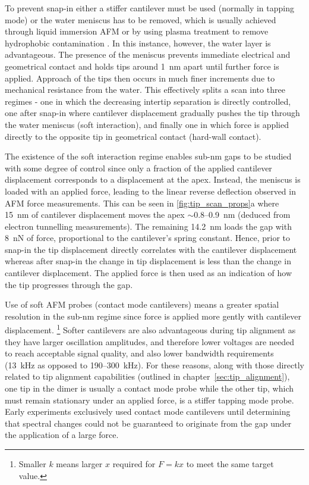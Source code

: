 \documentclass[a4paper]{article}
\begin{document}
To prevent snap-in either a stiffer cantilever must be used (normally in tapping mode) \cite{zhong1993fractured} or the water meniscus has to be removed, which is usually achieved through liquid immersion AFM \cite{hansma1994tapping, putman1994tapping, song2014} or by using plasma treatment to remove hydrophobic contamination \cite{song2014}. In this instance, however, the water layer is advantageous. The presence of the meniscus prevents immediate electrical and geometrical contact and holds tips around \SI{1}{nm} apart until further force is applied. Approach of the tips then occurs in much finer increments due to mechanical resistance from the water. This effectively splits a scan into three regimes - one in which the decreasing intertip separation is directly controlled, one after snap-in where cantilever displacement gradually pushes the tip through the water meniscus (soft interaction), and finally one in which force is applied directly to the opposite tip in geometrical contact (hard-wall contact).

The existence of the soft interaction regime enables sub-nm gaps to be studied with some degree of control since only a fraction of the applied cantilever displacement corresponds to a displacement at the apex. Instead, the meniscus is loaded with an applied force, leading to the linear reverse deflection observed in AFM force measurements. This can be seen in \autoref{fig:tip_scan_props}a where \SI{15}{nm} of cantilever displacement moves the apex $\sim$0.8--\SI{0.9}{nm} (deduced from electron tunnelling measurements). The remaining \SI{14.2}{nm} loads the gap with \SI{8}{nN} of force, proportional to the cantilever's spring constant. Hence, prior to snap-in the tip displacement directly correlates with the cantilever displacement whereas after snap-in the change in tip displacement is less than the change in cantilever displacement. The applied force is then used as an indication of how the tip progresses through the gap.

Use of soft AFM probes (contact mode cantilevers) means a greater spatial resolution in the sub-nm regime since force is applied more gently with cantilever displacement.%
\footnote{Smaller $k$ means larger $x$ required for $F=kx$ to meet the same target value.}
Softer cantilevers are also advantageous during tip alignment as they have larger oscillation amplitudes, and therefore lower voltages are needed to reach acceptable signal quality, and also lower bandwidth requirements (\SI{13}{kHz} as opposed to 190--\SI{300}{kHz}).
For these reasons, along with those directly related to tip alignment capabilities (outlined in chapter~\ref{sec:tip_alignment}), one tip in the dimer is usually a contact mode probe while the other tip, which must remain stationary under an applied force, is a stiffer tapping mode probe. Early experiments exclusively used contact mode cantilevers until determining that spectral changes could not be guaranteed to originate from the gap under the application of a large force.
\end{document}
